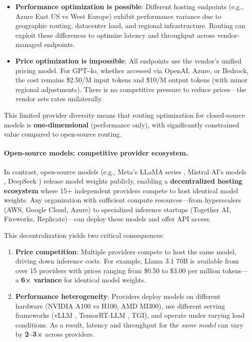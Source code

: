\documentclass[english]{article}
\begin{document}
\begin{itemize}
    \item \textbf{Performance optimization is possible}: Different hosting endpoints (e.g., Azure East US vs West Europe) exhibit performance variance due to geographic routing, datacenter load, and regional infrastructure. Routing can exploit these differences to optimize latency and throughput across vendor-managed endpoints.

    \item \textbf{Price optimization is impossible}: All endpoints use the vendor's unified pricing model. For GPT-4o, whether accessed via OpenAI, Azure, or Bedrock, the cost remains \$2.50/M input tokens and \$10/M output tokens (with minor regional adjustments). There is no competitive pressure to reduce prices—the vendor sets rates unilaterally.
\end{itemize}

This limited provider diversity means that routing optimization for closed-source models is \textbf{one-dimensional} (performance only), with significantly constrained value compared to open-source routing.

\paragraph{Open-source models: competitive provider ecosystem.}

In contrast, open-source models (e.g., Meta's LLaMA series \parencite{llama2023,llama3_2024}, Mistral AI's models \parencite{mistral2023}, DeepSeek \parencite{deepseek_v3}) release model weights publicly, enabling a \textbf{decentralized hosting ecosystem} where 15+ independent providers compete to host identical model weights. Any organization with sufficient compute resources—from hyperscalers (AWS, Google Cloud, Azure) to specialized inference startups (Together AI, Fireworks, Replicate)—can deploy these models and offer API access.

This decentralization yields two critical consequences:

\begin{enumerate}
    \item \textbf{Price competition}: Multiple providers compete to host the same model, driving down inference costs. For example, Llama 3.1 70B is available from over 15 providers with prices ranging from \$0.50 to \$3.00 per million tokens—a \textbf{6× variance} for identical model weights.
    \item \textbf{Performance heterogeneity}: Providers deploy models on different hardware (NVIDIA A100 vs H100, AMD MI300), use different serving frameworks (vLLM \parencite{vllm2023}, TensorRT-LLM \parencite{tensorrt_llm}, TGI), and operate under varying load conditions. As a result, latency and throughput for the \emph{same model} can vary by \textbf{2--3×} across providers.
\end{enumerate}
\end{document}

